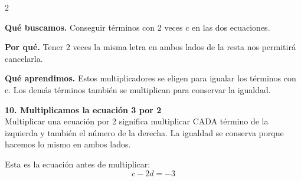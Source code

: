 \documentclass[11pt,a4paper,landscape]{article}
\begin{document}
\begin{multicols*}{2}
\begin{minipage}{\linewidth}
\par\smallskip\textbf{Qué buscamos.} Conseguir términos con 2 veces c en las dos ecuaciones.
\par\smallskip\textbf{Por qué.} Tener 2 veces la misma letra en ambos lados de la resta nos permitirá cancelarla.
\par{}\par\smallskip
\par\smallskip\textbf{Qué aprendimos.} Estos multiplicadores se eligen para igualar los términos con c. Los demás términos también se multiplican para conservar la igualdad.
\end{minipage}\par\medskip
\noindent\begin{minipage}{\linewidth}\textbf{10. Multiplicamos la ecuación 3 por 2}\\[2pt]Multiplicar una ecuación por 2 significa multiplicar CADA término de la izquierda y también el número de la derecha. La igualdad se conserva porque hacemos lo mismo en ambos lados.
\par\smallskip Esta es la ecuación antes de multiplicar:
\[c - 2d = -3\]
\par{}\par\smallskip

\end{minipage}
\end{multicols*}
\end{document}
